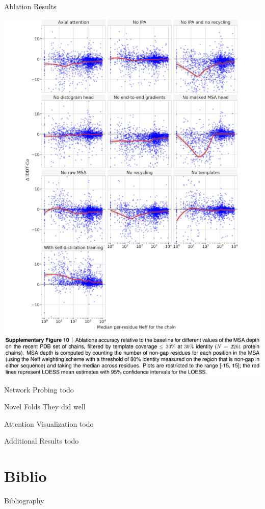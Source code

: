 \documentclass[presentation, smaller]{beamer}
\begin{document}
\begin{frame}[label={sec:orgb02dcfd}]{Ablation Results \cite{jumperHighlyAccurateProtein2021}}
\begin{center}
\includegraphics[height=0.9\textheight]{./imgs/fig10_ablation_results.png}
\end{center}
\end{frame}

\begin{frame}[label={sec:orgc2c6ae2}]{Network Probing \cite{jumperHighlyAccurateProtein2021}}
todo
\end{frame}

\begin{frame}[label={sec:org2c6d0de}]{Novel Folds}
They did well
\end{frame}

\begin{frame}[label={sec:orge514d65}]{Attention Visualization \cite{jumperHighlyAccurateProtein2021}}
todo
\end{frame}

\begin{frame}[label={sec:org1a3b814}]{Additional Results \cite{jumperHighlyAccurateProtein2021}}
todo
\end{frame}

\section*{Biblio}
\label{sec:org9cf49fc}
\begin{frame}[fragile,allowframebreaks,label=]{Bibliography}
\printbibliography
\end{frame}
\end{document}
